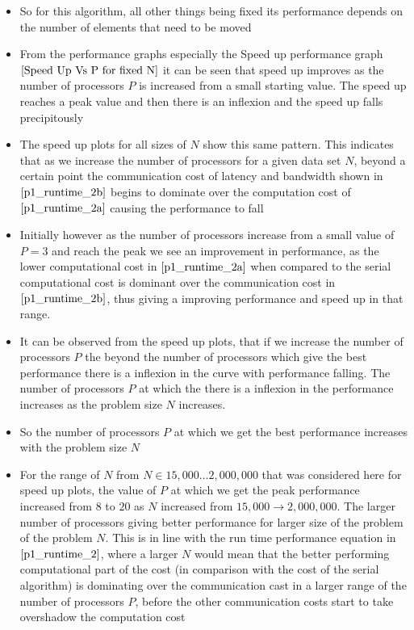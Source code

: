 \documentclass[twoside,11pt]{article}\usepackage{amsmath,amsfonts,amsthm,fullpage}
\begin{document}
\begin{itemize}
\item
So for this algorithm, all other things being fixed its performance depends on the number of elements that need to be moved
\item
From the performance graphs especially the Speed up performance graph $\ref{Speed Up Vs P for fixed N}$ it can be seen that speed up improves as the number of processors $P$ is increased from a small starting value. The speed up reaches a peak value and then there is an inflexion and the speed up falls precipitously
\item
The speed up plots for all sizes of $N$ show this same pattern. This indicates that as we increase the number of processors for a given data set $N$, beyond a certain point the communication cost of latency and bandwidth shown in $\eqref{p1_runtime_2b}$ begins to dominate over the computation cost of $\eqref{p1_runtime_2a}$ causing the performance to fall
\item
Initially however as the number of processors increase from a small value of $P=3$ and reach the peak we see an improvement in performance, as the lower computational cost in  $\eqref{p1_runtime_2a}$ when compared to the serial computational cost is dominant over the communication cost in $\eqref{p1_runtime_2b}$, thus giving a improving performance and speed up in that range.
\item
It can be observed from the speed up plots, that if we increase the number of processors $P$ the beyond the number of processors which give the best performance there is a inflexion in the curve with performance falling. The number of processors $P$ at which the there is a inflexion in the performance increases as the problem size $N$ increases. 
\item
So the number of processors $P$ at which we get the best performance increases with the problem size $N$
\item
For the range of $N$ from $N \in 15,000 \dots 2,000,000$ that was considered here for speed up plots, the value of $P$ at which we get the peak performance increased from $8$ to $20$ as $N$ increased from $15,000 \to 2,000,000$. The larger number of processors giving better performance for larger size of the problem of the problem $N$. This is in line with the run time performance equation in $\eqref{p1_runtime_2}$, where a larger $N$ would mean that the better performing computational part of the cost (in comparison with the cost of the serial algorithm) is dominating over the communication cast in a larger range of the number of processors $P$, before the other communication costs start to take overshadow the computation cost

\end{itemize}
\end{document}
